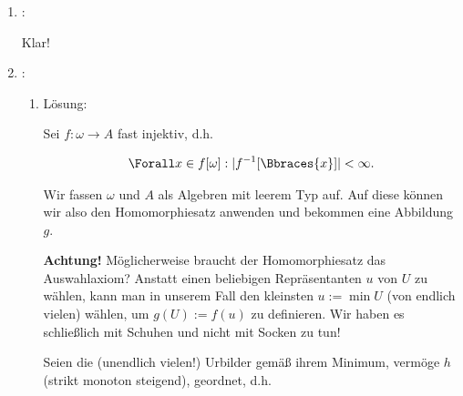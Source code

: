 \begin{solution}

\phantom{}

\begin{enumerate}[label = \texttt{ad}]

  \item {}:

  Klar!

  \item {}:
  
  \begin{enumerate}[label = \arabic*.]

    \item Lösung:
    
    Sei $f: \omega \to A$ fast injektiv, d.h.

    \begin{align*}
      \Forall x \in f[\omega]:
      |f^{-1}[\Bbraces{x}]| < \infty.
    \end{align*}

    Wir fassen $\omega$ und $A$ als Algebren mit leerem Typ auf.
    Auf diese können wir also den Homomorphiesatz anwenden und bekommen eine Abbildung $g$.

    \textbf{Achtung!}
    Möglicherweise braucht der Homomorphiesatz das Auswahlaxiom?
    Anstatt einen beliebigen Repräsentanten $u$ von $U$ zu wählen, kann man in unserem Fall den kleinsten $u := \min U$ (von endlich vielen) wählen, um $g(U) := f(u)$ zu definieren.
    Wir haben es schließlich mit Schuhen und nicht mit Socken zu tun!

    \phantom{}


    \phantom{}

    Seien die (unendlich vielen!) Urbilder gemäß ihrem Minimum, vermöge $h$ (strikt monoton steigend), geordnet, d.h.


\end{enumerate}
\end{enumerate}
\end{solution}
